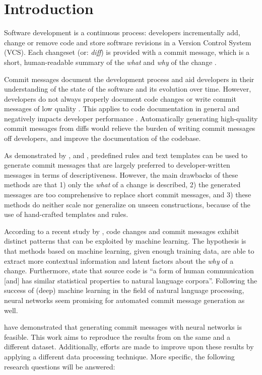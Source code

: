 \section{Introduction}
Software development is a continuous process: developers incrementally add, change or remove code and store software revisions in a Version Control System (VCS). Each changeset (or: \textit{diff}) is provided with a commit message, which is a short, human-readable summary of the \textit{what} and \textit{why} of the change \citep{buse_automatically_2010}.

Commit messages document the development process and aid developers in their understanding of the state of the software and its evolution over time. However, developers do not always properly document code changes or write commit messages of low quality \citep{dyer_boa:_2013}. This applies to code documentation in general and negatively impacts developer performance \citep{roehm_how_2012}. Automatically generating high-quality commit messages from diffs would relieve the burden of writing commit messages off developers, and improve the documentation of the codebase.

As demonstrated by \citet{buse_automatically_2010}, \citet{cortes-coy_automatically_2014} and \citet{shen_automatic_2016}, predefined rules and text templates can be used to generate commit messages that are largely preferred to developer-written messages in terms of descriptiveness. However, the main drawbacks of these methods are that 1) only the \textit{what} of a change is described, 2) the generated messages are too comprehensive to replace short commit messages, and 3) these methods do neither scale nor generalize on unseen constructions, because of the use of hand-crafted templates and rules.

According to a recent study by \citet{jiang_towards_2017}, code changes and commit messages exhibit distinct patterns that can be exploited by machine learning. The hypothesis is that methods based on machine learning, given enough training data, are able to extract more contextual information and latent factors about the \textit{why} of a change. Furthermore, \citet{allamanis_survey_2018} state that source code is ``a form of human communication [and] has similar statistical properties to natural language corpora''. Following the success of (deep) machine learning in the field of natural language processing, neural networks seem promising for automated commit message generation as well.

\citet{jiang_automatically_2017} have demonstrated that generating commit messages with neural networks is feasible. This work aims to reproduce the results from \cite{jiang_automatically_2017} on the same and a different dataset. Additionally, efforts are made to improve upon these results by applying a different data processing technique. More specific, the following research questions will be answered:

